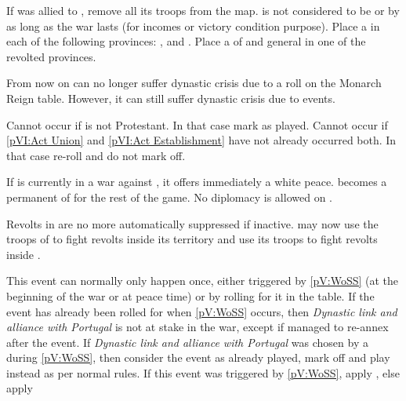 
\phevnt
\aparag If \paysecosse was allied to \ANG, remove all its troops from the map.
\bparag \paysecosse is not considered to be \VASSAL or \ANNEXION by \ANG as
long as the war lasts (for incomes or victory condition purpose).
\aparag Place a \REVOLT \facemoins in each of the following provinces:
\provinceHighlands, \provinceMoray and \provinceAlba.
\bparag Place a \ARMY\faceplus of \paysecosse and general  in one of the revolted provinces.





\effetlong
\aparag From now on \ENG can no longer suffer dynastic crisis due to a roll on
the Monarch Reign table.
\aparag However, it can still suffer dynastic crisis due to events.





\condition{}
\aparag Cannot occur if \ENG is not Protestant. In that case mark as played.
\aparag Cannot occur if \ref{pVI:Act Union} and \ref{pVI:Act Establishment}
have not already occurred both. In that case re-roll and do not mark off.

\phevnt
\aparag If \payshanovre is currently in a war against \ENG, it offers
immediately a white peace.
\aparag \payshanovre becomes a permanent \VASSAL of \ENG for the rest of the
game. No diplomacy is allowed on \payshanovre.

\effetlong
\ephase Revolts in  are no more automatically suppressed if
inactive.  \fphase \ANG may now use the troops of  to fight
revolts inside its territory and use its troops to fight revolts inside
.





\condition{}
\aparag This event can normally only happen once, either triggered by
\ref{pV:WoSS} (at the beginning of the war or at peace time) or by rolling for
it in the table.
\bparag If the event has already been rolled for when \ref{pV:WoSS} occurs,
then \emph{Dynastic link and alliance with Portugal} is not at stake in the
war, except if \HIS managed to re-annex \paysportugal after the event.
\bparag If \emph{Dynastic link and alliance with Portugal} was chosen by a
\MAJ during \ref{pV:WoSS}, then consider the event as already played, mark off
and play \RD instead as per normal rules.
\aparag If this event was triggered by \ref{pV:WoSS}, apply
, else apply 



